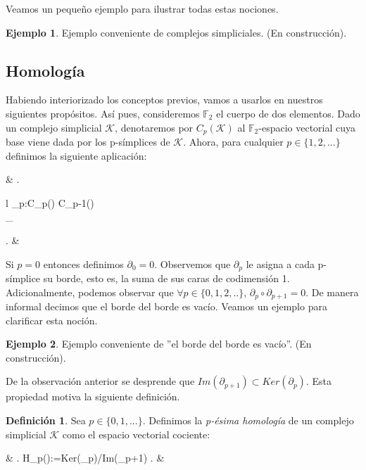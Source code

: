\documentclass[12pt]{article}
\numberwithin{equation}{section}
\theoremstyle{definition}
\newtheorem{defi}{Definición}
\newtheorem{ejem}{Ejemplo}
\theoremstyle{remark}
\theoremstyle{plain}
\begin{document}
		Veamos un pequeño ejemplo para ilustrar todas estas nociones.

		\begin{ejem}
			Ejemplo conveniente de complejos simpliciales. (En construcción).	
		\end{ejem}

	\subsection{Homología}	

		Habiendo interiorizado los conceptos previos, vamos a usarlos en nuestros siguientes propósitos. Así pues, consideremos $\mathbb{F}_{2}$ el cuerpo de dos elementos. Dado un
		complejo simplicial $\mathcal{K}$, denotaremos por $C_{p}(\mathcal{K})$ al $\mathbb{F}_{2}$-espacio vectorial cuya base viene dada por los p-símplices de $\mathcal{K}$. Ahora,
		para cualquier $p \in \{1,2,...\}$ definimos la siguiente aplicación: 
		\begin{flalign*}
			& \left.
			\begin{array}{l}
				\partial_{p}:C_{p}() \rightarrow C_{p-1}()\\[2pt] 
				\hspace{1.5cm} \sigma \mapsto \displaystyle \sum_{}\tau
			\end{array}
			\right. &
		\end{flalign*}
		
		Si $p=0$ entonces definimos $\partial_{0}=0$. Observemos que $\partial_{p}$ le asigna a cada p-símplice su borde, esto es, la suma de sus caras de codimensión 1. Adicionalmente, podemos
		observar que $\forall p \in \{0,1,2,..\}$, $\partial_{p}\circ \partial_{p+1}=0$. De manera informal decimos que el borde del borde es vacío. Veamos un ejemplo para clarificar esta noción.

		\begin{ejem}
		
			Ejemplo conveniente de ''el borde del borde es vacío''. (En construcción).

		\end{ejem}

		De la observación anterior se desprende que $Im(\partial_{p+1}) \subset Ker(\partial_{p})$. Esta propiedad motiva la siguiente definición.
		\begin{defi}
			Sea $p \in \{0,1,...\}$. Definimos la \textit{p-ésima homología} de un complejo simplicial $\mathcal{K}$ como el espacio vectorial cociente:	
			\begin{flalign*}
				& \left.
				H_{p}():=Ker(\partial_{p})/Im(\partial_{p+1})
				\right. &
			\end{flalign*}
		\end{defi}
\end{document}
